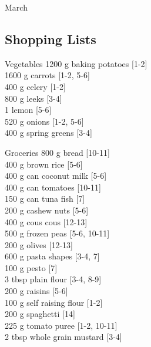 \begin{menu}{March}
    \subsection*{Shopping Lists}
      \begin{shoppinglist}{Vegetables}
      1200 g baking potatoes {\scriptsize[1-2]}\\
      1600 g carrots {\scriptsize[1-2, 5-6]}\\
      400 g celery {\scriptsize[1-2]}\\
      800 g leeks {\scriptsize[3-4]}\\
      1  lemon {\scriptsize[5-6]}\\
      520 g onions {\scriptsize[1-2, 5-6]}\\
      400 g spring greens {\scriptsize[3-4]}\\
      \end{shoppinglist}%
      \begin{shoppinglist}{Groceries}
      800 g bread {\scriptsize[10-11]}\\
      400 g brown rice {\scriptsize[5-6]}\\
      400 g can coconut milk {\scriptsize[5-6]}\\
      400 g can tomatoes {\scriptsize[10-11]}\\
      150 g can tuna fish {\scriptsize[7]}\\
      200 g cashew nuts {\scriptsize[5-6]}\\
      400 g cous cous {\scriptsize[12-13]}\\
      500 g frozen peas {\scriptsize[5-6, 10-11]}\\
      200 g olives {\scriptsize[12-13]}\\
      600 g pasta shapes {\scriptsize[3-4, 7]}\\
      100 g pesto {\scriptsize[7]}\\
      3 tbsp plain flour {\scriptsize[3-4, 8-9]}\\
      200 g raisins {\scriptsize[5-6]}\\
      100 g self raising flour {\scriptsize[1-2]}\\
      200 g spaghetti {\scriptsize[14]}\\
      225 g tomato puree {\scriptsize[1-2, 10-11]}\\
      2 tbsp whole grain mustard {\scriptsize[3-4]}\\
      \end{shoppinglist}%
      \par\vfil %

\end{menu}
